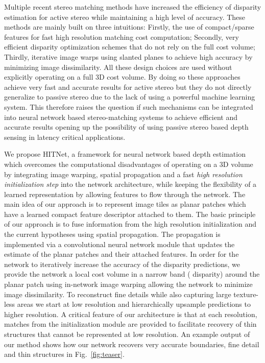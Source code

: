 \documentclass[final]{cvpr}
\newcommand{\Figure}[1]{Fig.~\ref{fig:#1}}
\newcommand{\algoname}{HITNet}
\begin{document}
Multiple recent stereo matching methods \cite{sos,fanello17_hashmatch,need4speed} have increased the efficiency of disparity estimation for active stereo while maintaining a high level of accuracy. These methods are mainly built on three intuitions: Firstly, the use of compact/sparse features for fast high resolution matching cost computation; Secondly, very efficient disparity optimization schemes that do not rely on the full cost volume; Thirdly, iterative image warps using slanted planes to achieve high accuracy by minimizing image dissimilarity. All these design choices are used without explicitly operating on a full 3D cost volume. By doing so these approaches achieve very fast and accurate results for active stereo but they do not directly generalize to passive stereo due to the lack of using a powerful machine learning system. This therefore raises the question if such mechanisms can be integrated into neural network based stereo-matching systems to achieve efficient and accurate results opening up the possibility of using passive stereo based depth sensing in latency critical applications.

We propose \algoname, a framework for neural network based depth estimation which overcomes the computational disadvantages of operating on a 3D volume by integrating image warping, spatial propagation and a fast \textit{high resolution initialization step} into the network architecture, while keeping the flexibility of a learned representation by allowing features to flow through the network. The main idea of our approach is to represent image tiles as planar patches which have a learned compact feature descriptor attached to them. The basic principle of our approach is to fuse information from the high resolution initialization and the current hypotheses using spatial propagation. The propagation is implemented via a convolutional neural network module that updates the estimate of the planar patches and their attached features. In order for the network to iteratively increase the accuracy of the disparity predictions, we provide the network a local cost volume in a narrow band ( disparity) around the planar patch using in-network image warping allowing the network to minimize image dissimilarity. To reconstruct fine details while also capturing large texture-less areas we start at low resolution and hierarchically upsample predictions to higher resolution. A critical feature of our architecture is that at each resolution, matches from the initialization module are provided to facilitate recovery of thin structures that cannot be represented at low resolution. An example output of our method shows how our network recovers very accurate boundaries, fine detail and thin structures in \Figure{teaser}.
\end{document}
